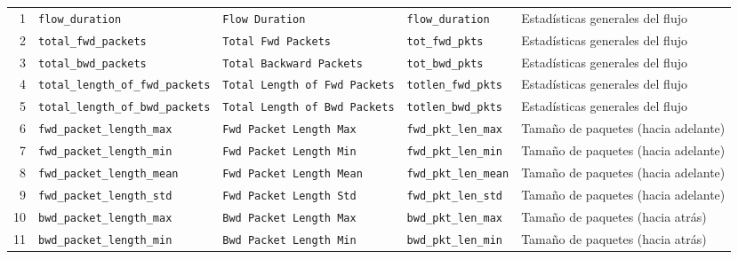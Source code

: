 \begin{landscape}
\begin{longtable}{@{}r p{4.2cm} p{4.4cm} p{4.1cm} p{4.8cm}@{}}
1 & \texttt{flow\_\allowbreak{}duration} & \texttt{Flow Duration} & \texttt{flow\_\allowbreak{}duration} & Estadísticas generales del flujo \\
2 & \texttt{total\_\allowbreak{}fwd\_\allowbreak{}packets} & \texttt{Total Fwd Packets} & \texttt{tot\_\allowbreak{}fwd\_\allowbreak{}pkts} & Estadísticas generales del flujo \\
3 & \texttt{total\_\allowbreak{}bwd\_\allowbreak{}packets} & \texttt{Total Backward Packets} & \texttt{tot\_\allowbreak{}bwd\_\allowbreak{}pkts} & Estadísticas generales del flujo \\
4 & \texttt{total\_\allowbreak{}length\_\allowbreak{}of\_\allowbreak{}fwd\_\allowbreak{}packets} & \texttt{Total Length of Fwd Packets} & \texttt{totlen\_\allowbreak{}fwd\_\allowbreak{}pkts} & Estadísticas generales del flujo \\
5 & \texttt{total\_\allowbreak{}length\_\allowbreak{}of\_\allowbreak{}bwd\_\allowbreak{}packets} & \texttt{Total Length of Bwd Packets} & \texttt{totlen\_\allowbreak{}bwd\_\allowbreak{}pkts} & Estadísticas generales del flujo \\
6 & \texttt{fwd\_\allowbreak{}packet\_\allowbreak{}length\_\allowbreak{}max} & \texttt{Fwd Packet Length Max} & \texttt{fwd\_\allowbreak{}pkt\_\allowbreak{}len\_\allowbreak{}max} & Tamaño de paquetes (hacia adelante) \\
7 & \texttt{fwd\_\allowbreak{}packet\_\allowbreak{}length\_\allowbreak{}min} & \texttt{Fwd Packet Length Min} & \texttt{fwd\_\allowbreak{}pkt\_\allowbreak{}len\_\allowbreak{}min} & Tamaño de paquetes (hacia adelante) \\
8 & \texttt{fwd\_\allowbreak{}packet\_\allowbreak{}length\_\allowbreak{}mean} & \texttt{Fwd Packet Length Mean} & \texttt{fwd\_\allowbreak{}pkt\_\allowbreak{}len\_\allowbreak{}mean} & Tamaño de paquetes (hacia adelante) \\
9 & \texttt{fwd\_\allowbreak{}packet\_\allowbreak{}length\_\allowbreak{}std} & \texttt{Fwd Packet Length Std} & \texttt{fwd\_\allowbreak{}pkt\_\allowbreak{}len\_\allowbreak{}std} & Tamaño de paquetes (hacia adelante) \\
10 & \texttt{bwd\_\allowbreak{}packet\_\allowbreak{}length\_\allowbreak{}max} & \texttt{Bwd Packet Length Max} & \texttt{bwd\_\allowbreak{}pkt\_\allowbreak{}len\_\allowbreak{}max} & Tamaño de paquetes (hacia atrás) \\
11 & \texttt{bwd\_\allowbreak{}packet\_\allowbreak{}length\_\allowbreak{}min} & \texttt{Bwd Packet Length Min} & \texttt{bwd\_\allowbreak{}pkt\_\allowbreak{}len\_\allowbreak{}min} & Tamaño de paquetes (hacia atrás) \\

\end{longtable}
\end{landscape}
